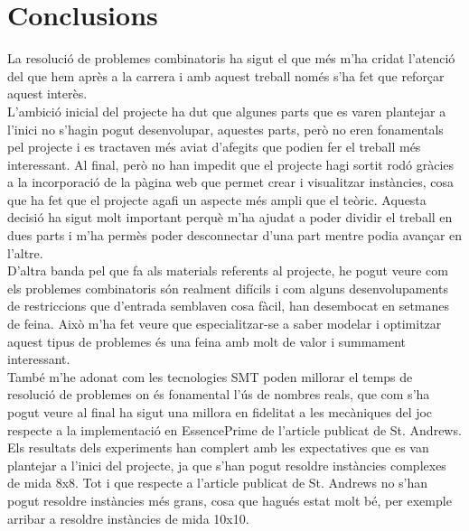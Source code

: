 


\chapter{Conclusions} %

\label{Conclusions} %
La resolució de problemes combinatoris ha sigut el que més m'ha cridat l'atenció del que hem après a la carrera i amb aquest treball només s'ha fet que reforçar aquest interès.\\
L'ambició inicial del projecte ha dut que algunes parts que es varen plantejar a l'inici no s'hagin pogut desenvolupar, aquestes parts, però no eren fonamentals pel projecte i es tractaven més aviat d'afegits que podien fer el treball més interessant. Al final, però no han impedit que el projecte hagi sortit rodó gràcies a la incorporació de la pàgina web que permet crear i visualitzar instàncies, cosa que ha fet que el projecte agafi un aspecte més ampli que el teòric. Aquesta decisió ha sigut molt important perquè m'ha ajudat a poder dividir el treball en dues parts i m'ha permès poder desconnectar d'una part mentre podia avançar en l'altre.\\

D'altra banda pel que fa als materials referents al projecte, he pogut veure com els problemes combinatoris són realment difícils i com alguns desenvolupaments de restriccions que d'entrada semblaven cosa fàcil, han desembocat en setmanes de feina. Això m'ha fet veure que especialitzar-se a saber modelar i optimitzar aquest tipus de problemes és una feina amb molt de valor i summament interessant.\\
També m'he adonat com les tecnologies SMT poden millorar el temps de resolució de problemes on és fonamental l'ús de nombres reals, que com s'ha pogut veure al final ha sigut una millora en fidelitat a les mecàniques del joc respecte a la implementació en EssencePrime de l'article publicat de St. Andrews.\\
Els resultats dels experiments han complert amb les expectatives que es van plantejar a l'inici del projecte, ja que s'han pogut resoldre instàncies complexes de mida 8x8. Tot i que respecte a l'article publicat de St. Andrews no s'han pogut resoldre instàncies més grans, cosa que hagués estat molt bé, per exemple arribar a resoldre instàncies de mida 10x10.